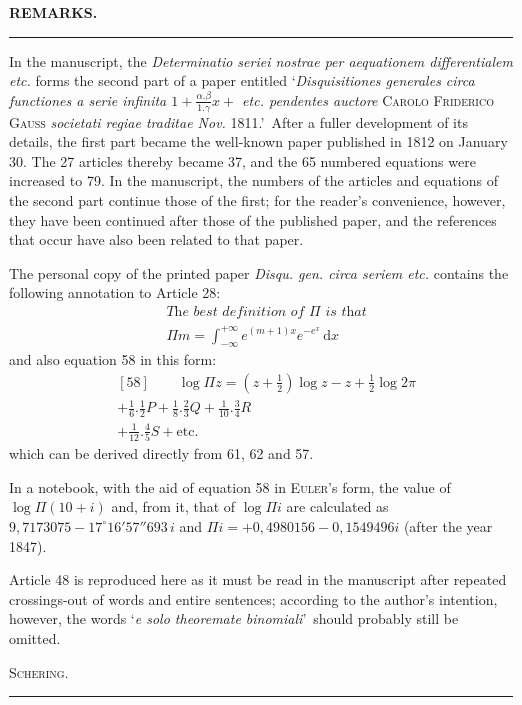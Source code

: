 \clearpage{}
\begin{center}\textbf{REMARKS.}\par\smallskip\rule{.15\linewidth}{.4pt}\end{center}
In the manuscript, the \textit{Determinatio seriei nostrae per aequationem differentialem etc.} forms the second part of a paper entitled \lq\textit{Disquisitiones generales circa functiones a serie infinita $1+\frac{\alpha.\beta}{1.\gamma}x+$ etc. pendentes auctore} \textsc{Carolo Friderico Gauss} \textit{societati regiae traditae Nov.} 1811.\rq\ After a fuller development of its details, the first part became the well-known paper published in 1812 on January 30. The 27 articles thereby became 37, and the 65 numbered equations were increased to 79. In the manuscript, the numbers of the articles and equations of the second part continue those of the first; for the reader's convenience, however, they have been continued after those of the published paper, and the references that occur have also been related to that paper.

The personal copy of the printed paper \textit{Disqu. gen. circa seriem etc.} contains the following annotation to Article 28:
\[
\begin{aligned}&\textit{The best definition of }\Pi\textit{ is that}\\&
\Pi m=\int_{-\infty}^{+\infty}e^{(m+1)x}e^{-e^x}\,\mathrm dx\end{aligned}
\]
and also equation 58 in this form:
\[
\begin{aligned}&[58]\qquad \log\Pi z=(z+\tfrac12)\log z-z+\tfrac12\log2\pi\\&+\tfrac16.\tfrac12 P+\tfrac18.\tfrac23 Q+\tfrac1{10}.\tfrac34 R\\&+\tfrac1{12}.\tfrac45 S+\text{etc.}\end{aligned}
\]
which can be derived directly from 61, 62 and 57.

In a notebook, with the aid of equation 58 in \textsc{Euler}'s form, the value of $\log\Pi(10+i)$ and, from it, that of $\log\Pi i$ are calculated as
$9{,}7173075-17^\circ16'57''693\,i$ and
$\Pi i=+0{,}4980156-0{,}1549496i$ (after the year 1847).

Article 48 is reproduced here as it must be read in the manuscript after repeated crossings-out of words and entire sentences; according to the author's intention, however, the words \lq\textit{e solo theoremate binomiali}\rq\ should probably still be omitted.
\begin{flushright}\textsc{Schering.}\end{flushright}
\begin{center}\rule{.4\linewidth}{.4pt}\end{center}

